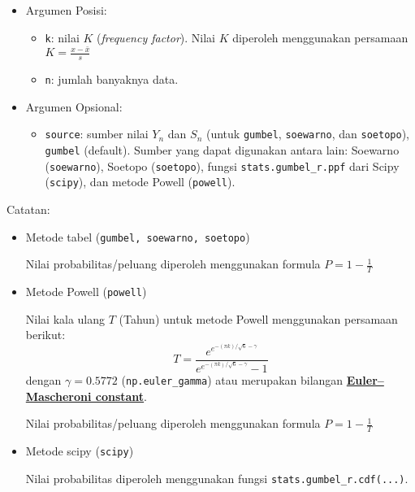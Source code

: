 \documentclass[11pt]{article}
\providecommand{\tightlist}{%
      \setlength{\itemsep}{0pt}\setlength{\parskip}{0pt}}
\begin{document}
\begin{itemize}
\tightlist
\item
  Argumen Posisi:

  \begin{itemize}
  \tightlist
  \item
    \texttt{k}: nilai \(K\) (\emph{frequency factor}). Nilai \(K\)
    diperoleh menggunakan persamaan \(K = \frac{x - \bar{x}}{s}\)
  \item
    \texttt{n}: jumlah banyaknya data.
  \end{itemize}
\item
  Argumen Opsional:

  \begin{itemize}
  \tightlist
  \item
    \texttt{source}: sumber nilai \(Y_n\) dan \(S_n\) (untuk
    \texttt{\textquotesingle{}gumbel\textquotesingle{}},
    \texttt{\textquotesingle{}soewarno\textquotesingle{}}, dan
    \texttt{\textquotesingle{}soetopo\textquotesingle{}}),
    \texttt{\textquotesingle{}gumbel\textquotesingle{}} (default).
    Sumber yang dapat digunakan antara lain: Soewarno
    (\texttt{\textquotesingle{}soewarno\textquotesingle{}}), Soetopo
    (\texttt{\textquotesingle{}soetopo\textquotesingle{}}), fungsi
    \texttt{stats.gumbel\_r.ppf} dari Scipy
    (\texttt{\textquotesingle{}scipy\textquotesingle{}}), dan metode
    Powell (\texttt{\textquotesingle{}powell\textquotesingle{}}).
  \end{itemize}
\end{itemize}

Catatan:

\begin{itemize}
\item
  Metode tabel
  (\texttt{\textquotesingle{}gumbel\textquotesingle{},\ \textquotesingle{}soewarno\textquotesingle{},\ \textquotesingle{}soetopo\textquotesingle{}})

  Nilai probabilitas/peluang diperoleh menggunakan formula
  \(P=1-\frac{1}{T}\)
\item
  Metode Powell (\texttt{\textquotesingle{}powell\textquotesingle{}})

  Nilai kala ulang \(T\) (Tahun) untuk metode Powell menggunakan
  persamaan berikut:
  \[T=\frac{e^{e^{-\left(\pi k\right)/\sqrt{6}-\gamma}}}{e^{e^{-\left(\pi k\right)/\sqrt{6}-\gamma}}-1}\]
  dengan \(\gamma = 0.5772\) (\texttt{np.euler\_gamma}) atau merupakan
  bilangan
  \href{https://en.wikipedia.org/wiki/Euler\%27s_constant}{\textbf{Euler--Mascheroni
  constant}}.

  Nilai probabilitas/peluang diperoleh menggunakan formula
  \(P=1-\frac{1}{T}\)
\item
  Metode scipy (\texttt{\textquotesingle{}scipy\textquotesingle{}})

  Nilai probabilitas diperoleh menggunakan fungsi
  \texttt{stats.gumbel\_r.cdf(...)}.
\end{itemize}
\end{document}
